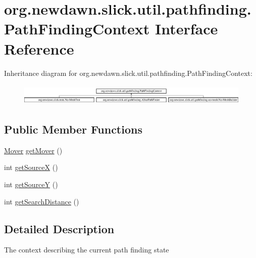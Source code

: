 \hypertarget{interfaceorg_1_1newdawn_1_1slick_1_1util_1_1pathfinding_1_1_path_finding_context}{}\section{org.\+newdawn.\+slick.\+util.\+pathfinding.\+Path\+Finding\+Context Interface Reference}
\label{interfaceorg_1_1newdawn_1_1slick_1_1util_1_1pathfinding_1_1_path_finding_context}
Inheritance diagram for org.\+newdawn.\+slick.\+util.\+pathfinding.\+Path\+Finding\+Context\+:\begin{figure}[H]
\begin{center}
\leavevmode
\includegraphics[height=1.028466cm]{interfaceorg_1_1newdawn_1_1slick_1_1util_1_1pathfinding_1_1_path_finding_context}
\end{center}
\end{figure}
\subsection*{Public Member Functions}
\begin{DoxyCompactItemize}
\item 
\mbox{\hyperlink{interfaceorg_1_1newdawn_1_1slick_1_1util_1_1pathfinding_1_1_mover}{Mover}} \mbox{\hyperlink{interfaceorg_1_1newdawn_1_1slick_1_1util_1_1pathfinding_1_1_path_finding_context_a50e439d467ccdf457dca18ca60ab367c}{get\+Mover}} ()
\item 
int \mbox{\hyperlink{interfaceorg_1_1newdawn_1_1slick_1_1util_1_1pathfinding_1_1_path_finding_context_a7b67cdc7d0eaf54e6e07d09b1a575065}{get\+SourceX}} ()
\item 
int \mbox{\hyperlink{interfaceorg_1_1newdawn_1_1slick_1_1util_1_1pathfinding_1_1_path_finding_context_a30ac68532d0f3e9e5f4ce5e5e88f593e}{get\+SourceY}} ()
\item 
int \mbox{\hyperlink{interfaceorg_1_1newdawn_1_1slick_1_1util_1_1pathfinding_1_1_path_finding_context_af6c873041cbca8ad6edfd63c6e10d243}{get\+Search\+Distance}} ()
\end{DoxyCompactItemize}


\subsection{Detailed Description}
The context describing the current path finding state

